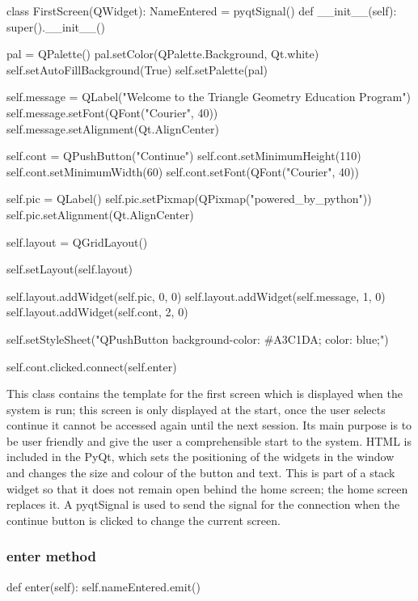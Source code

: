\begin{python}
class FirstScreen(QWidget):
    NameEntered = pyqtSignal()
    def __init__(self):
        super().__init__()

        pal = QPalette()
        pal.setColor(QPalette.Background, Qt.white)
        self.setAutoFillBackground(True)
        self.setPalette(pal)

        self.message = QLabel("Welcome to the Triangle Geometry Education Program")
        self.message.setFont(QFont("Courier", 40))
        self.message.setAlignment(Qt.AlignCenter)

        self.cont = QPushButton("Continue")
        self.cont.setMinimumHeight(110)
        self.cont.setMinimumWidth(60)
        self.cont.setFont(QFont("Courier", 40))

        self.pic = QLabel()
        self.pic.setPixmap(QPixmap("powered_by_python"))
        self.pic.setAlignment(Qt.AlignCenter)

        self.layout = QGridLayout()

        self.setLayout(self.layout)

        self.layout.addWidget(self.pic, 0, 0) 
        self.layout.addWidget(self.message, 1, 0)
        self.layout.addWidget(self.cont, 2, 0)

        self.setStyleSheet("QPushButton {background-color: #A3C1DA; color: blue;}")

        self.cont.clicked.connect(self.enter)
\end{python}

This class contains the template for the first screen which is displayed when the system is run; this screen is only displayed at the start, once the user selects continue it cannot be accessed again until the next session. Its main purpose is to be user friendly and give the user a comprehensible start to the system. HTML is included in the PyQt, which sets the positioning of the widgets in the window and changes the size and colour of the button and text. This is part of a stack widget so that it does not remain open behind the home screen; the home screen replaces it. A pyqtSignal is used to send the signal for the connection when the continue button is clicked to change the current screen.

\subsubsection{enter method}

\begin{python}
def enter(self):
	self.nameEntered.emit()
\end{python}

